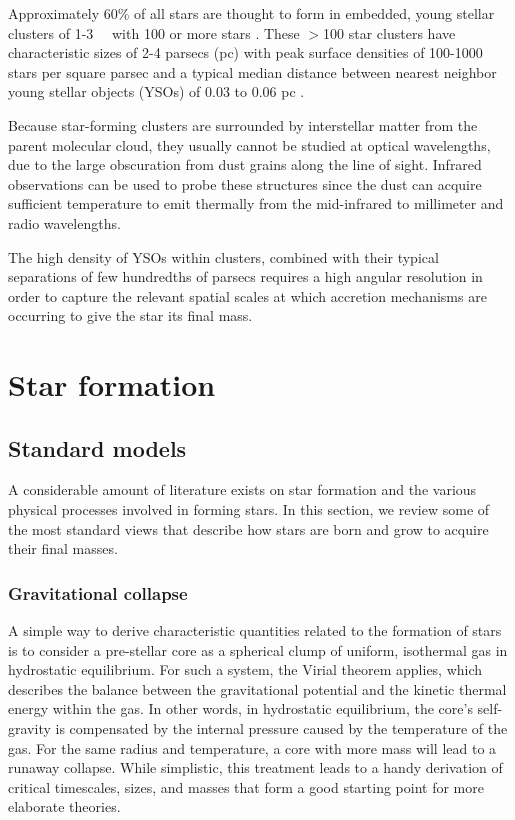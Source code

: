 Approximately 60\% of all stars are thought to form in embedded, young stellar clusters of 1-\SI{3}{\mega\year} with 100 or more stars \citep{Porras:2003kxa,Allen:2007wqa}. These $>$100 star clusters have characteristic sizes of 2-4 parsecs (pc) with peak surface densities of 100-\si{1000} stars per square parsec and a typical median distance between nearest neighbor young stellar objects (YSOs) of 0.03 to 0.06 pc \citep{Gutermuth:2009gca}.

Because star-forming clusters are surrounded by interstellar matter from the parent molecular cloud, they usually cannot be studied at optical wavelengths, due to the large obscuration from dust grains along the line of sight. Infrared observations can be used to probe these structures since the dust can acquire sufficient temperature to emit thermally from the mid-infrared to millimeter and radio wavelengths. 

The high density of YSOs within clusters, combined with their typical separations of few hundredths of parsecs requires a high angular resolution in order to capture the relevant spatial scales at which accretion mechanisms are occurring to give the star its final mass.




\section{Star formation}

\subsection{Standard models}

A considerable amount of literature exists on star formation and the various physical processes involved in forming stars. In this section, we review some of the most standard views that describe how stars are born and grow to acquire their final masses.

\subsubsection{Gravitational collapse}

A simple way to derive characteristic quantities related to the formation of stars is to consider a pre-stellar core as a spherical clump of uniform, isothermal gas in hydrostatic equilibrium. For such a system, the Virial theorem applies, which describes the balance between the gravitational potential and the kinetic thermal energy within the gas. In other words, in hydrostatic equilibrium, the core's self-gravity is compensated by the internal pressure caused by the temperature of the gas. For the same radius and temperature, a core with more mass will lead to a runaway collapse. While simplistic, this treatment leads to a handy derivation of critical timescales, sizes, and masses that form a good starting point for more elaborate theories. 

